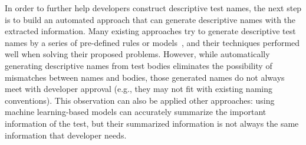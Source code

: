 In order to further help developers construct descriptive test names, the next step is to build an automated approach that can generate descriptive names with the extracted information.
%
Many existing approaches try to generate descriptive test names by a series of pre-defined rules or models~\cite{arcuri2014automated, zhang2015automatically, allamanis2015suggesting, daka2017generating, li2019deepfl}, and their techniques performed well when solving their proposed problems.
However, while automatically generating descriptive names from test bodies eliminates the possibility of mismatches between names and bodies, those generated names do not always meet with developer approval (e.g., they may not fit with existing naming conventions).
%
This observation can also be applied other approaches: using machine learning-based models can accurately summarize the important information of the test, but their summarized information is not always the same information that developer needs.


